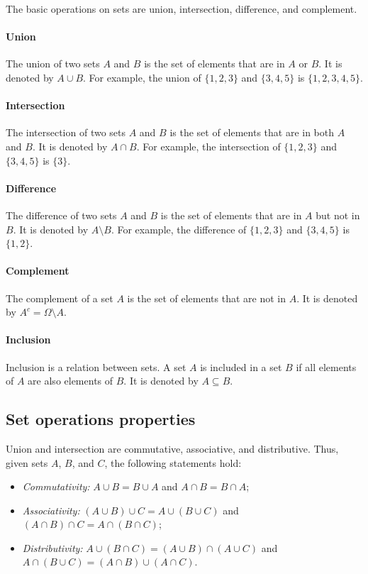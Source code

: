 The basic operations on sets are union, intersection, difference, and complement.

\paragraph{Union}  The union of two sets $A$ and $B$ is the set of elements that are in
$A$ or $B$.  It is denoted by $A \cup B$.  For example, the union of $\{1, 2, 3\}$ and
$\{3, 4, 5\}$ is $\{1, 2, 3, 4, 5\}$.

\paragraph{Intersection}  The intersection of two sets $A$ and $B$ is the set of elements
that are in both $A$ and $B$.  It is denoted by $A \cap B$.  For example, the intersection
of $\{1, 2, 3\}$ and $\{3, 4, 5\}$ is $\{3\}$.

\paragraph{Difference}  The difference of two sets $A$ and $B$ is the set of elements
that are in $A$ but not in $B$.  It is denoted by $A \setminus B$.  For example, the
difference of $\{1, 2, 3\}$ and $\{3, 4, 5\}$ is $\{1, 2\}$.

\paragraph{Complement}  The complement of a set $A$ is the set of elements that are not
in $A$.  It is denoted by $A^c = \Omega \setminus A$.

\paragraph{Inclusion}  Inclusion is a relation between sets.  A set $A$ is included in a
set $B$ if all elements of $A$ are also elements of $B$.  It is denoted by $A \subseteq B$.

\subsection{Set operations properties}

Union and intersection are commutative, associative, and distributive.  Thus, given sets
$A$, $B$, and $C$, the following statements hold:
\begin{itemize}
  \item \emph{Commutativity:} $A \cup B = B \cup A$ and $A \cap B = B \cap A$;
  \item \emph{Associativity:} $(A \cup B) \cup C = A \cup (B \cup C)$ and $(A \cap B) \cap C = A \cap (B \cap C)$;
  \item \emph{Distributivity:} $A \cup (B \cap C) = (A \cup B) \cap (A \cup C)$ and $A \cap (B \cup C) = (A \cap B) \cup (A \cap C)$.
\end{itemize}

